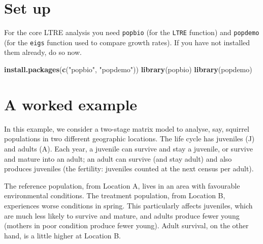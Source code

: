 \documentclass[
  a4paper]{book}
\newenvironment{Shaded}{\begin{snugshade}}{\end{snugshade}}
\newcommand{\FunctionTok}[1]{\textcolor[rgb]{0.13,0.29,0.53}{\textbf{#1}}}
\newcommand{\NormalTok}[1]{#1}
\newcommand{\StringTok}[1]{\textcolor[rgb]{0.31,0.60,0.02}{#1}}
\begin{document}
\section{Set up}\label{set-up}

For the core LTRE analysis you need \texttt{popbio} (for the \texttt{LTRE} function) and \texttt{popdemo} (for the \texttt{eigs} function used to compare growth rates). If you have not installed them already, do so now.

\begin{Shaded}
\begin{Highlighting}[]
\FunctionTok{install.packages}\NormalTok{(}\FunctionTok{c}\NormalTok{(}\StringTok{"popbio"}\NormalTok{, }\StringTok{"popdemo"}\NormalTok{))}
\FunctionTok{library}\NormalTok{(popbio)}
\FunctionTok{library}\NormalTok{(popdemo)}
\end{Highlighting}
\end{Shaded}

\section{A worked example}\label{a-worked-example}

In this example, we consider a two-stage matrix model to analyse, say, squirrel populations in two different geographic locations. The life cycle has juveniles (J) and adults (A). Each year, a juvenile can survive and stay a juvenile, or survive and mature into an adult; an adult can survive (and stay adult) and also produces juveniles (the fertility: juveniles counted at the next census per adult).

The reference population, from Location A, lives in an area with favourable environmental conditions. The treatment population, from Location B, experiences worse conditions in spring. This particularly affects juveniles, which are much less likely to survive and mature, and adults produce fewer young (mothers in poor condition produce fewer young). Adult survival, on the other hand, is a little higher at Location B.
\end{document}
